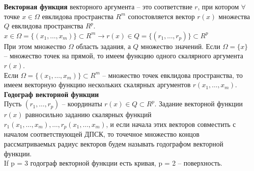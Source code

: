 \documentclass{report}
\begin{document}
\noindent
\textbf{Векторная функция} векторного аргумента -- это соответствие $r$, при котором
$\forall$ точке $x \in \Omega$ евклидова пространства $R^{m}$ сопостовляется 
вектор $r(x)$ множества $Q$ евклидова пространства $R^{p}$.\\
$x \in \Omega = \{(x_1, \ldots, x_m)\} \subset R^{m} \to r(x)
\in Q = \{(r_1, \ldots, r_p)\} \subset R^{p}$\\
При этом множество $\Omega$ область задания, а $Q$ множество значений.
Если $\Omega = \{x\}$ -- множество точек на прямой, то имеем функцию одного
скалярного аргумента $r(x)$.\\
Если $\Omega = \{(x_1, \ldots, x_m)\} \subset R^{m}$ -- множество точек евклидова
пространства, то имеем векторную функцию нескольких скалярных
аргументов $r(x_1, \ldots, x_m)$.\\

\noindent
\textbf{Годограф векторной функции}\\
Пусть $(r_1, \ldots, r_p)$ -- координаты $r(x) \in Q \subset R^{p}$.
Задание векторной функции $r(x)$ равносильно заданию скалярных функций\\
$r_1(x_1, \ldots, x_m), \ldots, r_p(x_1, \ldots, x_m)$, и если начала этих
векторов совместить с началом соответствующей ДПСК, то точечное множество концов
рассматриваемых радиус векторов будем называть годографом векторной функции.\\
If p = 3 годограф векторной функции есть кривая, p = 2 -- поверхность.\\
\end{document}
